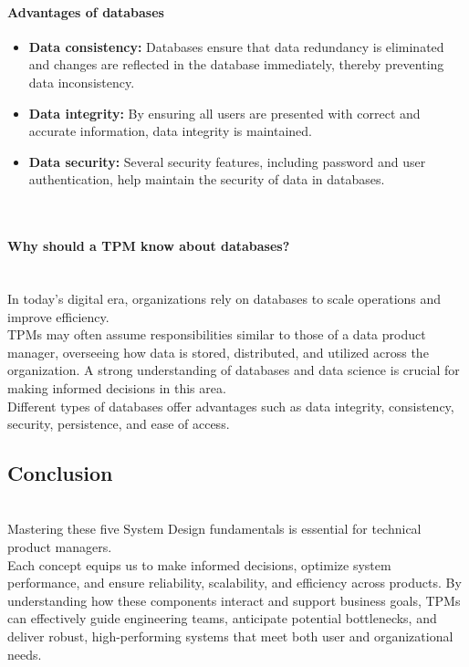 \paragraph{Advantages of databases}\label{p6wAYWE1_dP9Pivgeafij}

\begin{itemize}
\item
\protect{}\label{bp4vi_EBncbrKMrWo2WDN}
\textbf{Data consistency:} Databases ensure that data redundancy is eliminated and changes are reflected in the database immediately, thereby preventing data inconsistency.
\item
\protect{}\label{HzGn-V5G_PN3x8pEmNqaC}
\textbf{Data integrity:} By ensuring all users are presented with correct and accurate information, data integrity is maintained.
\item
\protect{}\label{FM-u9rb_krlf1MKrnY9b2}
\textbf{Data security:} Several security features, including password and user authentication, help maintain the security of data in databases.
\end{itemize}
\\
\paragraph{Why should a TPM know about databases?}\label{52oUVemzY-MDcH6u_hgzJ}
\\
In today's digital era, organizations rely on databases to scale operations and improve efficiency.
\\
TPMs may often assume responsibilities similar to those of a data product manager, overseeing how data is stored, distributed, and utilized across the organization. A strong understanding of databases and data science is crucial for making informed decisions in this area.
\\
Different types of databases offer advantages such as data integrity, consistency, security, persistence, and ease of access.

\subsection{Conclusion}\label{csdYWV0K2kljXTd0N9wG5}
\\
Mastering these five System Design fundamentals is essential for technical product managers.
\\
Each concept equips us to make informed decisions, optimize system performance, and ensure reliability, scalability, and efficiency across products. By understanding how these components interact and support business goals, TPMs can effectively guide engineering teams, anticipate potential bottlenecks, and deliver robust, high-performing systems that meet both user and organizational needs.

